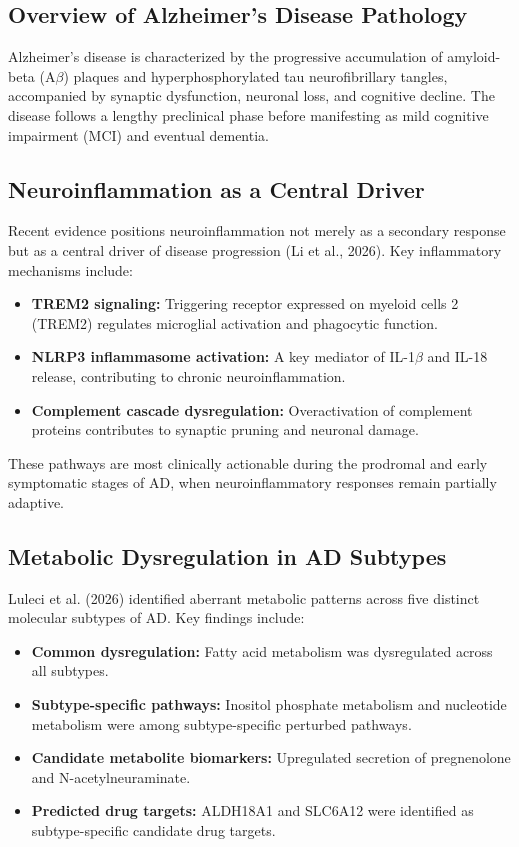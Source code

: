 \documentclass[11pt, a4paper]{article}
\begin{document}
\subsection{Overview of Alzheimer's Disease Pathology}

Alzheimer's disease is characterized by the progressive accumulation of amyloid-beta (A$\beta$) plaques and hyperphosphorylated tau neurofibrillary tangles, accompanied by synaptic dysfunction, neuronal loss, and cognitive decline. The disease follows a lengthy preclinical phase before manifesting as mild cognitive impairment (MCI) and eventual dementia.

\subsection{Neuroinflammation as a Central Driver}

Recent evidence positions neuroinflammation not merely as a secondary response but as a central driver of disease progression (Li et al., 2026). Key inflammatory mechanisms include:

\begin{itemize}
    \item \textbf{TREM2 signaling:} Triggering receptor expressed on myeloid cells 2 (TREM2) regulates microglial activation and phagocytic function.
    \item \textbf{NLRP3 inflammasome activation:} A key mediator of IL-1$\beta$ and IL-18 release, contributing to chronic neuroinflammation.
    \item \textbf{Complement cascade dysregulation:} Overactivation of complement proteins contributes to synaptic pruning and neuronal damage.
\end{itemize}

These pathways are most clinically actionable during the prodromal and early symptomatic stages of AD, when neuroinflammatory responses remain partially adaptive.

\subsection{Metabolic Dysregulation in AD Subtypes}

Luleci et al. (2026) identified aberrant metabolic patterns across five distinct molecular subtypes of AD. Key findings include:

\begin{itemize}
    \item \textbf{Common dysregulation:} Fatty acid metabolism was dysregulated across all subtypes.
    \item \textbf{Subtype-specific pathways:} Inositol phosphate metabolism and nucleotide metabolism were among subtype-specific perturbed pathways.
    \item \textbf{Candidate metabolite biomarkers:} Upregulated secretion of pregnenolone and N-acetylneuraminate.
    \item \textbf{Predicted drug targets:} ALDH18A1 and SLC6A12 were identified as subtype-specific candidate drug targets.
\end{itemize}
\end{document}
